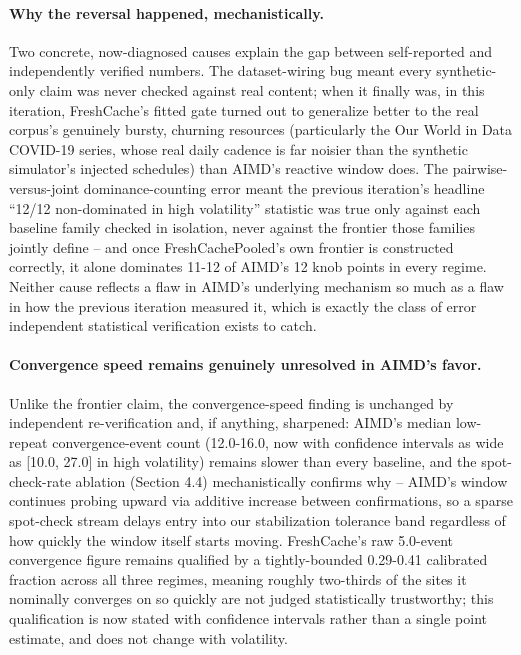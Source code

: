\documentclass[11pt,letterpaper]{article}
\begin{document}
\paragraph{Why the reversal happened, mechanistically.} Two concrete, now-diagnosed causes explain the gap between
self-reported and independently verified numbers. The dataset-wiring bug meant every synthetic-only claim
was never checked against real content; when it finally was, in this iteration, FreshCache's fitted gate
turned out to generalize better to the real corpus's genuinely bursty, churning resources (particularly the
Our World in Data COVID-19 series, whose real daily cadence is far noisier than the synthetic simulator's
injected schedules) than AIMD's reactive window does. The pairwise-versus-joint dominance-counting error
meant the previous iteration's headline ``12/12 non-dominated in high volatility'' statistic was true only
against each baseline family checked in isolation, never against the frontier those families jointly define
-- and once FreshCachePooled's own frontier is constructed correctly, it alone dominates 11-12 of AIMD's 12
knob points in every regime. Neither cause reflects a flaw in AIMD's underlying mechanism so much as a flaw
in how the previous iteration measured it, which is exactly the class of error independent statistical
verification exists to catch.

\paragraph{Convergence speed remains genuinely unresolved in AIMD's favor.} Unlike the frontier claim, the
convergence-speed finding is unchanged by independent re-verification and, if anything, sharpened: AIMD's
median low-repeat convergence-event count (12.0-16.0, now with confidence intervals as wide as [10.0, 27.0]
in high volatility) remains slower than every baseline, and the spot-check-rate ablation (Section 4.4)
mechanistically confirms why -- AIMD's window continues probing upward via additive increase between
confirmations, so a sparse spot-check stream delays entry into our stabilization tolerance band regardless
of how quickly the window itself starts moving. FreshCache's raw 5.0-event convergence figure remains
qualified by a tightly-bounded 0.29-0.41 calibrated fraction across all three regimes, meaning roughly
two-thirds of the sites it nominally converges on so quickly are not judged statistically trustworthy;
this qualification is now stated with confidence intervals rather than a single point estimate, and does
not change with volatility.
\end{document}
